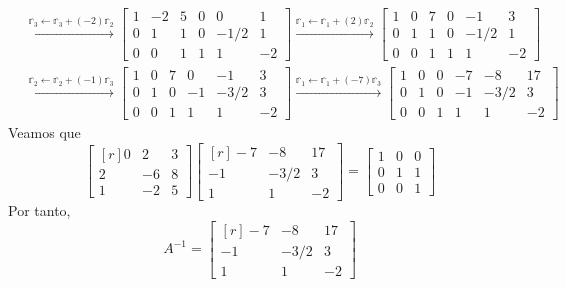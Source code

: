 \begin{example}
\begin{align*}
        & \xrightarrow{\mathbb{r}_3 \leftarrow \mathbb{r}_3 + (-2) \mathbb{r}_2} \left[ \begin{array}{rrr|rrr}
            1 & -2 & 5 & 0 & 0 & 1 \\
            0 & 1 & 1 & 0 & -1/2 & 1 \\
            0 & 0 & 1 & 1 & 1 & -2
        \end{array} \right] \xrightarrow{\mathbb{r}_1 \leftarrow \mathbb{r}_1 + (2) \mathbb{r}_2} \left[ \begin{array}{rrr|rrr}
            1 & 0 & 7 & 0 & -1 & 3 \\
            0 & 1 & 1 & 0 & -1/2 & 1 \\
            0 & 0 & 1 & 1 & 1 & -2
        \end{array} \right] \\
        & \xrightarrow{\mathbb{r}_2 \leftarrow \mathbb{r}_2 + (-1)\mathbb{r}_3} \left[ \begin{array}{rrr|rrr}
            1 & 0 & 7 & 0 & -1 & 3 \\
            0 & 1 & 0 & -1 & -3/2 & 3 \\
            0 & 0 & 1 & 1 & 1 & -2
        \end{array} \right]  \xrightarrow{\mathbb{r}_1 \leftarrow \mathbb{r}_1 + (-7) \mathbb{r}_3} \left[ \begin{array}{rrr|rrr}
            1 & 0 & 0 & -7 & -8 & 17 \\
            0 & 1 & 0 & -1 & -3/2 & 3 \\
            0 & 0 & 1 & 1 & 1 & -2
        \end{array} \right]
    \end{align*}
    Veamos que
    $$\begin{bmatrix*}[r]
        0 & 2 & 3 \\
        2 & -6 & 8 \\
        1 & -2 & 5
    \end{bmatrix*} \begin{bmatrix*}[r]
        -7 & -8 & 17 \\
        -1 & -3/2 & 3 \\
        1 & 1 & -2
    \end{bmatrix*} = \begin{bmatrix}
        1 & 0 & 0 \\
        0 & 1 & 1 \\
        0 & 0 & 1
    \end{bmatrix}$$
    Por tanto,
    $$A^{-1} = \begin{bmatrix*}[r]
        -7 & -8 & 17 \\
        -1 & -3/2 & 3 \\
        1 & 1 & -2
    \end{bmatrix*}$$
\end{example}

